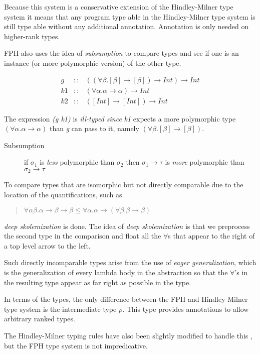 Because this system is a conservative extension of the Hindley-Milner type system it means that any program type able in the Hindley-Milner type system is still type able without any additional annotation. Annotation is only needed on higher-rank types.

FPH also uses the idea of \textit{subsumption} to compare types and see if one is an instance (or more polymorphic version) of the other type. 

\begin{eqnarray*}
g  &::& ((\forall\beta.[\beta] \rightarrow [\beta]) \rightarrow Int) \rightarrow Int \\
k1 &::& (\forall\alpha. \alpha \rightarrow \alpha) \rightarrow Int\\
k2 &::& ([Int] \rightarrow [Int]) \rightarrow Int
\end{eqnarray*}

The expression \textit{(g k1)} is \textit{ill-typed since} \textit{k1} expects a more polymorphic type $(\forall\alpha. \alpha \rightarrow \alpha)$ than \emph{g} can pass to it, namely $(\forall\beta.[\beta] \rightarrow [\beta])$. 

\begin{description}
\item[Subsumption] if $\sigma_1$ is \textit{less} polymorphic than $\sigma_2$ then $\sigma_1 \rightarrow \tau$ is \textit{more} polymorphic than $\sigma_2 \rightarrow \tau$
\end{description}

To compare types that are isomorphic but not directly comparable due to the location of the quantifications, such as
\begin{quotation}
$\forall\alpha\beta.\alpha\rightarrow\beta\rightarrow\beta\leq\forall\alpha.\alpha\rightarrow(\forall\beta.\beta\rightarrow\beta)$
\end{quotation}

\textit{deep skolemization} is done. The idea of \textit{deep skolemization} is that we preprocess the second type in the comparison and float all the $\forall$s that appear to the right of a top level arrow to the left.

Such directly incomparable types arise from the use of \textit{eager generalization}, which is the generalization of every lambda body in the abstraction so that the $\forall$'s in the resulting type appear as far right as possible in the type.

In terms of the types, the only difference between the FPH and Hindley-Milner type system is the intermediate type $\rho$. This type provides annotations to allow arbitrary ranked types.

The Hindley-Milner typing rules have also been slightly modified to handle this , but the FPH type system is not impredicative.
